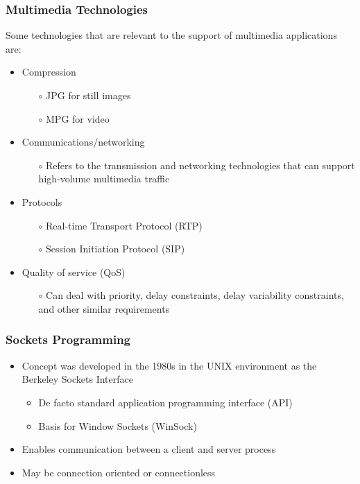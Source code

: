 \documentclass[pdflatex,compress]{beamer}
\begin{document}
\begin{frame}
	\frametitle{Multimedia Technologies}
	Some technologies that are relevant to the support of multimedia applications are:
	\begin{itemize}
		\item Compression
		\begin{itemize}
			\item[$ \circ $] JPG for still images
			\item[$ \circ $] MPG for video
		\end{itemize}
		\item Communications/networking\begin{itemize}
			\item[$ \circ $] Refers to the transmission and networking technologies that can support high-volume multimedia traffic
		\end{itemize}
		\item Protocols
		\begin{itemize}
			\item[$ \circ $] Real-time Transport Protocol (RTP)
			\item[$ \circ $] Session Initiation Protocol (SIP)
		\end{itemize}
		\item Quality of service (QoS)
		\begin{itemize}
			\item[$ \circ $] Can deal with priority, delay constraints, delay variability constraints, and other similar requirements
		\end{itemize}
	\end{itemize}
\end{frame}

\begin{frame}
	\frametitle{Sockets Programming}
	\begin{itemize}
		\item Concept was developed in the 1980s in the UNIX environment as the Berkeley Sockets Interface
		\begin{itemize}
			\item De facto standard application programming interface (API)
			\item Basis for Window Sockets (WinSock)
		\end{itemize}
		\item Enables communication between a client and server process
		\item May be connection oriented or connectionless
	\end{itemize}
\end{frame}
\end{document}
